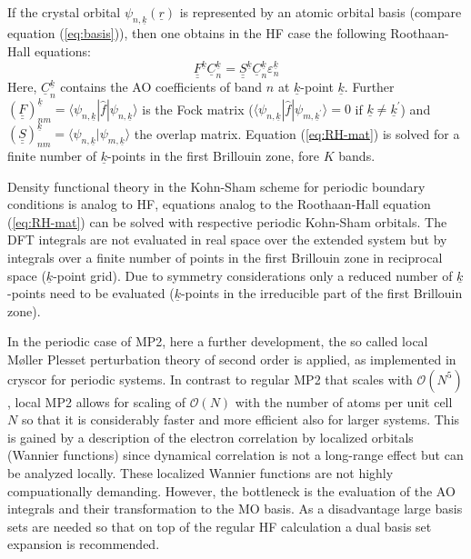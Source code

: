 \documentclass[11pt,DIV=13,BCOR=5mm,a4paper,headinclude]{scrbook}
\renewcommand{\vec}[1]{\underline{#1}}
\def\doubleunderline#1{\underline{\underline{#1}}}
\begin{document}
If the crystal orbital $\psi_{n,\vec{k}}(\vec{r})$ is represented by an atomic orbital basis (compare equation (\ref{eq:basis})), then one obtains in the HF case the following Roothaan-Hall equations:
\begin{equation}\label{eq:RH-mat}
  \doubleunderline{F}^{\vec{k}}\vec{C}_n^{\vec{k}}=\doubleunderline{S}^{\vec{k}}\vec{C}_n^{\vec{k}}\varepsilon_n^{\vec{k}}
\end{equation}
Here, $\vec{C}_n^{\vec{k}}$ contains the AO coefficients of band $n$ at $\vec{k}$-point $\vec{k}$.
Further $(\doubleunderline{F})^{\vec{k}}_{nm}=\langle \psi_{n,\vec{k}}|\hat{f}|\psi_{n,\vec{k}}\rangle$ is the Fock matrix ($\langle \psi_{n,\vec{k}}|\hat{f}|\psi_{m,\vec{k}^\prime}\rangle=0$ if $\vec{k}\neq \vec{k}^\prime$) and $(\doubleunderline{S})^{\vec{k}}_{nm}=\langle \psi_{n,\vec{k}}|\psi_{m,\vec{k}}\rangle$ the overlap matrix.
Equation (\ref{eq:RH-mat}) is solved for a finite number of $\vec{k}$-points in the first Brillouin zone, fore $K$ bands.

Density functional theory in the Kohn-Sham scheme for periodic boundary conditions is analog to HF, equations analog to the Roothaan-Hall equation (\ref{eq:RH-mat}) can be solved with respective periodic Kohn-Sham orbitals. %
The DFT integrals are not evaluated in real space over the extended system but by integrals over a finite number of points in the first Brillouin zone in reciprocal space ($\vec{k}$-point grid).
Due to symmetry considerations only a reduced number of $\vec{k}$-points need to be evaluated ($\vec{k}$-points in the irreducible part of the first Brillouin zone).


In the periodic case of MP2, here a further development, the so called local M\o{}ller Plesset perturbation theory of second order\cite{usvyat2015,usvyatbook,Maschio2007} is applied, as implemented in cryscor\cite{cryscor} for periodic systems.
In contrast to regular MP2 that scales with $\mathcal{O}(N^5)$, local MP2 allows for scaling of $\mathcal{O}(N)$ with the number of atoms per unit cell $N$ so that it is considerably faster and more efficient also for larger systems.
This is gained by a description of the electron correlation by localized orbitals (Wannier functions) since dynamical correlation is not a long-range effect but can be analyzed locally.
These localized Wannier functions are not highly compuationally demanding.
However, the bottleneck is the evaluation of the AO integrals and their transformation to the MO basis.
As a disadvantage large basis sets are needed so that on top of the regular HF calculation a dual basis set expansion is recommended\cite{Usvyat2010}.
\end{document}
